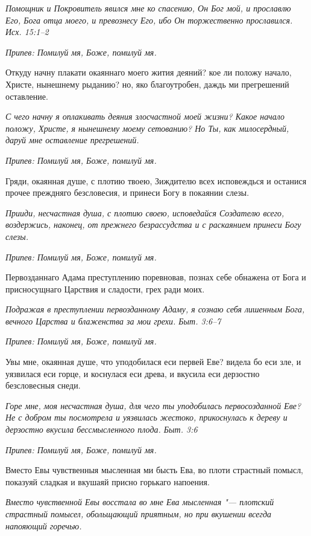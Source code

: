 \itshape Помощник и Покровитель явился мне ко спасению, Он Бог мой, и прославлю Его, Бога отца моего, и превознесу Его, ибо Он торжественно прославился. Исх. 15:1–2\normalfont{}


\itshape Припев:\normalfont{} Помилуй мя, Боже, помилуй мя.


Откуду начну плакати окаяннаго моего жития деяний? кое ли положу начало, Христе, нынешнему рыданию? но, яко благоутробен, даждь ми прегрешений оставление.


\itshape С чего начну я оплакивать деяния злосчастной моей жизни? Какое начало положу, Христе, я нынешнему моему сетованию? Но Ты, как милосердный, даруй мне оставление прегрешений.\normalfont{}


\itshape Припев:\normalfont{} Помилуй мя, Боже, помилуй мя.


Гряди, окаянная душе, с плотию твоею, Зиждителю всех исповеждься и останися прочее преждняго безсловесия, и принеси Богу в покаянии слезы.


\itshape Прииди, несчастная душа, с плотию своею, исповедайся Создателю всего, воздержись, наконец, от прежнего безрассудства и с раскаянием принеси Богу слезы.\normalfont{}


\itshape Припев:\normalfont{} Помилуй мя, Боже, помилуй мя.


Первозданнаго Адама преступлению поревновав, познах себе обнажена от Бога и присносущнаго Царствия и сладости, грех ради моих.


\itshape Подражая в преступлении первозданному Адаму, я сознаю себя лишенным Бога, вечного Царства и блаженства за мои грехи. Быт. 3:6–7\normalfont{}


\itshape Припев:\normalfont{} Помилуй мя, Боже, помилуй мя.


Увы мне, окаянная душе, что уподобилася еси первей Еве? видела бо еси зле, и уязвилася еси горце, и коснулася еси древа, и вкусила еси дерзостно безсловесныя снеди.


\itshape Горе мне, моя несчастная душа, для чего ты уподобилась первосозданной Еве? Не с добром ты посмотрела и уязвилась жестоко, прикоснулась к дереву и дерзостно вкусила бессмысленного плода. Быт. 3:6\normalfont{}


\itshape Припев:\normalfont{} Помилуй мя, Боже, помилуй мя.


Вместо Евы чувственныя мысленная ми бысть Ева, во плоти страстный помысл, показуяй сладкая и вкушаяй присно горькаго напоения.


\itshape Вместо чувственной Евы восстала во мне Ева мысленная "--- плотский страстный помысел, обольщающий приятным, но при вкушении всегда напояющий горечью.\normalfont{}


